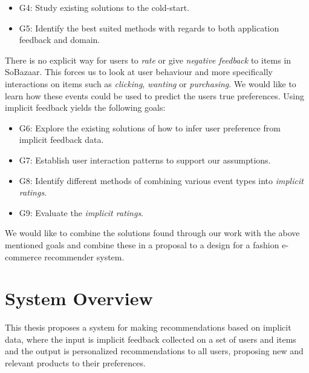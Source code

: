 \begin{itemize}
  \item G4: Study existing solutions to the cold-start.
  \item G5: Identify the best suited methods with regards to both application
  feedback and domain. 
\end{itemize}

There is no explicit way for users to \textit{rate} or give \textit{negative
feedback} to items in SoBazaar. This forces us to look at user behaviour and
more specifically interactions on items such as \textit{clicking},
\textit{wanting} or \textit{purchasing}. We would like to learn how these
events could be used to predict the users true preferences. Using implicit
feedback yields the following goals:

\begin{itemize}
  \item G6: Explore the existing solutions of how to infer user preference from
  implicit feedback data.
  \item G7: Establish user interaction patterns to support our assumptions.
  \item G8: Identify different methods of combining various event types into
  \emph{implicit ratings}.
  \item G9: Evaluate the \emph{implicit ratings}.
\end{itemize}

We would like to combine the solutions found through our work with the above
mentioned goals and combine these in a proposal to a design for a fashion
e-commerce recommender system.

\section{System Overview}


This thesis proposes a system for making recommendations based on implicit
data, where the input is implicit feedback collected on a set of users and
items and the output is personalized recommendations to all users, proposing
new and relevant products to their preferences.

